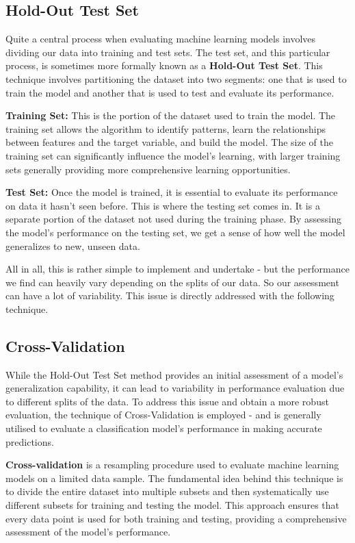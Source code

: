 \documentclass[letterpaper,10pt]{article}
\begin{document}
\subsection{Hold-Out Test Set}
Quite a central process when evaluating machine learning models involves dividing our data into training and test sets. The test set, and this particular process, is sometimes more formally known as a \textbf{Hold-Out Test Set}. This technique involves partitioning the dataset into two segments: one that is used to train the model and another that is used to test and evaluate its performance. \par

\textbf{Training Set:} This is the portion of the dataset used to train the model. The training set allows the algorithm to identify patterns, learn the relationships between features and the target variable, and build the model. The size of the training set can significantly influence the model’s learning, with larger training sets generally providing more comprehensive learning opportunities.

\textbf{Test Set:} Once the model is trained, it is essential to evaluate its performance on data it hasn't seen before. This is where the testing set comes in. It is a separate portion of the dataset not used during the training phase. By assessing the model's performance on the testing set, we get a sense of how well the model generalizes to new, unseen data. \par

All in all, this is rather simple to implement and undertake - but the performance we find can heavily vary depending on the splits of our data. So our assessment can have a lot of variability. This issue is directly addressed with the following technique. 

\subsection{Cross-Validation}
While the Hold-Out Test Set method provides an initial assessment of a model's generalization capability, it can lead to variability in performance evaluation due to different splits of the data. To address this issue and obtain a more robust evaluation, the technique of Cross-Validation is employed - and is generally utilised to evaluate a classification model's performance in making accurate predictions. \par

\textbf{Cross-validation} is a resampling procedure used to evaluate machine learning models on a limited data sample. The fundamental idea behind this technique is to divide the entire dataset into multiple subsets and then systematically use different subsets for training and testing the model. This approach ensures that every data point is used for both training and testing, providing a comprehensive assessment of the model's performance. \par
\end{document}
